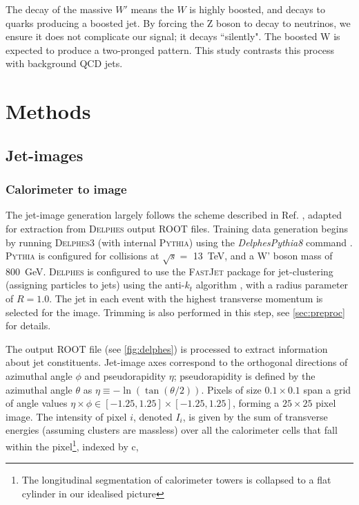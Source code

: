 \documentclass[twocolumn,twoside]{article}
\newcommand{\pkg}[1]{\textsc{#1}}
\begin{document}
The decay of the massive $W'$ means the $W$ is highly boosted, and decays to quarks producing a boosted jet. By forcing the Z boson to decay to neutrinos, we ensure it does not complicate our signal; it decays ``silently". The boosted W is expected to produce a two-pronged pattern. This study contrasts this process with background QCD jets.
 





\section{Methods}
\label{sec:methods}

\subsection{Jet-images}
\subsubsection{Calorimeter to image}
The jet-image generation largely follows the scheme described in Ref. \cite{de2015jet}, adapted for extraction from \pkg{Delphes} output \pkg{ROOT} files. Training data generation begins by running \pkg{Delphes}3 (with internal \pkg{Pythia}) using the \textit{DelphesPythia8} command \cite{workbook}. \pkg{Pythia} is configured for collisions at $\sqrt{s} =$ \SI{13}{\tera\electronvolt}, and a W' boson mass of \SI{800}{\giga\electronvolt}. \pkg{Delphes} is configured to use the \pkg{FastJet} \cite{fastjet} package for jet-clustering (assigning particles to jets) using the anti-$k_t$ algorithm \cite{antikt}, with a radius parameter of $R=1.0$. The jet in each event with the highest transverse momentum is selected for the image. Trimming is also performed in this step, see \cref{sec:preproc} for details.

The output \pkg{ROOT} file (see \cref{fig:delphes}) is processed to extract information about jet constituents. Jet-image axes correspond to the orthogonal directions of azimuthal angle $\phi$ and pseudorapidity $\eta$; pseudorapidity is defined by the azimuthal angle $\theta$ as $\eta \equiv -\ln(\tan(\theta/2))$. Pixels of size $0.1 \times 0.1$ span a grid of angle values $\eta \times \phi \in [-1.25, 1.25]\times [-1.25, 1.25]$, forming a $25\times 25$ pixel image. The intensity of pixel $i$, denoted $I_i$, is given by the sum of transverse energies (assuming clusters are massless) over all the calorimeter cells that fall within the pixel\footnote{The longitudinal segmentation of calorimeter towers is collapsed to a flat cylinder in our idealised picture}, indexed by c, 
\end{document}
